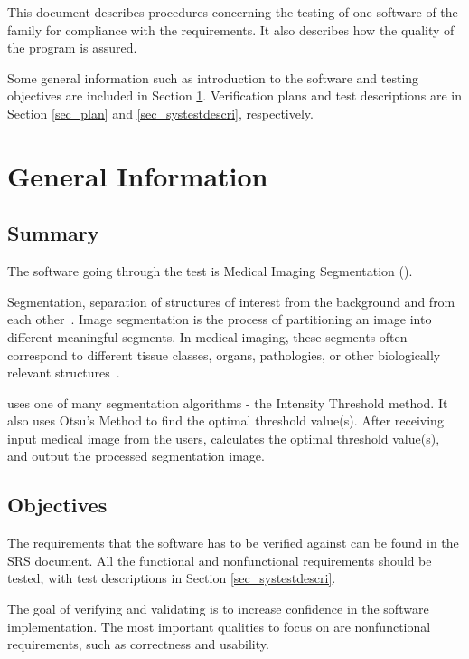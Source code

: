 \documentclass[12pt, titlepage]{article}
\begin{document}
\newpage


This document describes procedures concerning the testing of one software of
the \famname{} family for compliance with the requirements. It also describes how the
quality of the program is assured.

Some general information such as introduction to the software and testing
objectives are included in Section \ref{sec_geinfo}. Verification plans and
test descriptions are in Section \ref{sec_plan} and \ref{sec_systestdescri},
respectively.

\section{General Information} \label{sec_geinfo}

\subsection{Summary}

The software going through the test is Medical Imaging Segmentation
(\progname{}).

Segmentation, separation of structures of interest from the background and from
each other~\cite{Bankman2000}. Image segmentation is the process of
partitioning an image into different meaningful segments. In medical imaging,
these segments
often correspond to different tissue classes, organs, pathologies, or other
biologically relevant structures~\cite{Forouzanfar2010}.

\progname{} uses one of many segmentation algorithms - the Intensity Threshold
method. It also uses Otsu's Method to find the optimal threshold value(s).
After receiving input medical image from the users, \progname{} calculates the
optimal threshold value(s), and output the processed segmentation image.

\subsection{Objectives}
\label{Sec_objectives}
The requirements that the software has to be verified against can be found in
the SRS document. All the functional and nonfunctional requirements should be
tested, with test descriptions in Section \ref{sec_systestdescri}.

The goal of verifying and validating is to increase confidence in the software
implementation. The most important qualities to focus on are nonfunctional
requirements, such as correctness and usability.
\end{document}
